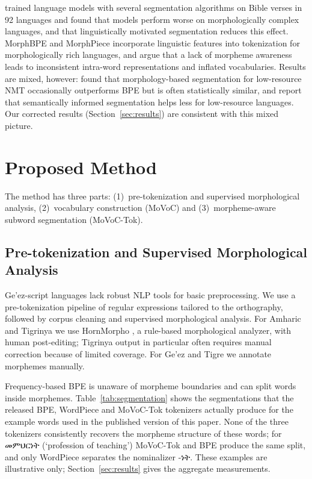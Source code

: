\documentclass[11pt]{article}
\newcommand{\eth}[1]{{\ethiopicfont #1}}
\newcommand{\movoctok}{MoVoC-Tok}
\begin{document}
\citet{park-etal-2021-morphology} trained language models with several
segmentation algorithms on Bible verses in 92 languages and found that models
perform worse on morphologically complex languages, and that linguistically
motivated segmentation reduces this effect. MorphBPE
\citep{asgari2025morphbpe} and MorphPiece \citep{jabbar2023morphpiece}
incorporate linguistic features into tokenization for morphologically rich
languages, and \citet{bauwens-delobelle-2024-bpe} argue that a lack of
morpheme awareness leads to inconsistent intra-word representations and
inflated vocabularies. Results are mixed, however:
\citet{saleva-lignos-2021-effectiveness} found that morphology-based
segmentation for low-resource NMT occasionally outperforms BPE but is often
statistically similar, and \citet{libovicky-helcl-2024-lexically} report that
semantically informed segmentation helps less for low-resource languages.
Our corrected results (Section~\ref{sec:results}) are consistent with this
mixed picture.

\section{Proposed Method}
\label{sec:method}

The method has three parts: (1)~pre-tokenization and supervised morphological
analysis, (2)~vocabulary construction (MoVoC) and (3)~morpheme-aware subword
segmentation (\movoctok{}).

\subsection{Pre-tokenization and Supervised Morphological Analysis}
\label{sec:pretok}

Ge'ez-script languages lack robust NLP tools for basic preprocessing. We use a
pre-tokenization pipeline of regular expressions tailored to the orthography,
followed by corpus cleaning and supervised morphological analysis. For Amharic
and Tigrinya we use HornMorpho \citep{gasser2011hornmorpho}, a rule-based
morphological analyzer, with human post-editing; Tigrinya output in particular
often requires manual correction because of limited coverage. For Ge'ez and
Tigre we annotate morphemes manually.

Frequency-based BPE is unaware of morpheme boundaries and can split words
inside morphemes. Table~\ref{tab:segmentation} shows the segmentations that
the released BPE, WordPiece and \movoctok{} tokenizers actually produce for
the example words used in the published version of this paper. None of the
three tokenizers consistently recovers the morpheme structure of these words;
for \eth{መምህርነት} (`profession of teaching') \movoctok{} and BPE produce
the same split, and only WordPiece separates the nominalizer \eth{-ነት}.
These examples are illustrative only; Section~\ref{sec:results} gives the
aggregate measurements.
\end{document}
